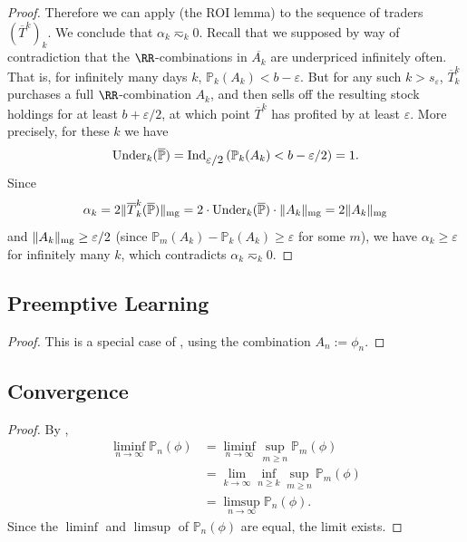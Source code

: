 \documentclass[authordate,onecolumn,noenvironments]{miri-tech-article}
\numberwithin{equation}{subsection}
\newcommand{\seq}[1]{{\overline{#1}}}
\newcommand{\aff}{A}
\newcommand{\trade}{T}%
\newcommand{\Trader}{\seq{\trade}} %
\newcommand{\magnit}[1]{{\|#1\|_{\rm mg}}} %
\newcommand{\BelState}{\mathbb{P}}
\newcommand{\pt}{\BelState}
\newcommand{\MP}{\seq{\pt}}
\newcommand{\ftn}{(\MP)} %
\newcommand{\underpriced}{{\rm Under}}
\newcommand{\localportfoliovalue}{b}
\newcommand{\ctsind}[1]{\operatorname{Ind}_{\text{\small{${#1}$}}}} %
\begin{document}
\begin{proof}
Therefore we can apply  (the ROI lemma) to the sequence of traders $(\Trader^k)_k$. We conclude that  $\alpha_k \eqsim_k 0$.
%
Recall that we supposed by way of contradiction that 
the $\RR$-combinations in $\seq{\aff_k}$ are underpriced infinitely often. That is, for infinitely many days $k$,
$\pt_{k}(\aff_{k})< \localportfoliovalue - \varepsilon$. 
But for any such $k>s_\varepsilon$, $\Trader^k_k$ purchases a full  $\RR$-combination  $\aff_k$, 
and then sells off the resulting stock holdings for at least $\localportfoliovalue + \varepsilon/2$, at which point
$\Trader^k$ has profited by at least $\varepsilon$. More precisely, for these $k$ we have 
%
\[ \underpriced_k(\MP)
= \ctsind{\varepsilon/2}\left( \pt_{k}(\aff_{k})  < \localportfoliovalue - \varepsilon/2\right) = 1 .\]
%
Since 
%
\[ \alpha_k = 2 \magnit{\Trader^k_k \ftn} = 2 \cdot \underpriced_k \ftn \cdot \magnit{\aff_k} = 2 \magnit{\aff_k}
\]
%
 and $\magnit{\aff_k} \geq \varepsilon/2$ (since $\pt_m(\aff_k) - \pt_k(\aff_k) \geq  \varepsilon$ for some $m$),
we have $\alpha_k \geq \varepsilon$ for infinitely many $k$,
which contradicts $\alpha_k \eqsim_k 0$.
\end{proof}


\subsection{Preemptive Learning}\label{app:tbo}

\restatetbo*

\begin{proof}
  This is a special case of , using the combination $\aff_n := \phi_n$.
\end{proof}

\subsection{Convergence}\label{app:con}


\convergence*


\begin{proof}
  By ,
\begin{align*}
 \liminf_{n \to \infty} \pt_n(\phi) 
 &= \liminf_{n \to \infty} \sup_{m \geq n} \pt_m(\phi) \\
  &= \lim_{k \to \infty} \inf_{n \geq k} \sup_{m \geq n} \pt_m(\phi) \\
 &= \limsup_{n \to \infty} \pt_n(\phi).
\end{align*}
Since the $\liminf$ and $\limsup$ of $\pt_n(\phi)$ are equal, the limit exists.
\end{proof}
\end{document}

